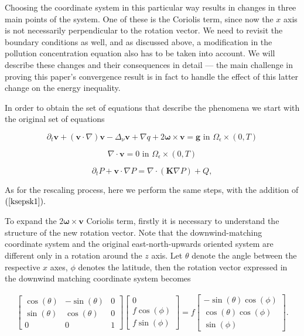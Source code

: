 \documentclass[11pt]{article}
\begin{document}
Choosing the coordinate system in this particular way results in changes in three main points of the system. One of these is the Coriolis term, since now the $x$ axis is not necessarily perpendicular to the rotation vector. We need to revisit the boundary conditions as well, and as discussed above, a modification in the pollution concentration equation also has to be taken into account. We will describe these changes and their consequences in detail --- the main challenge in proving this paper's convergence result is in fact to handle the effect of this latter change on the energy inequality.

In order to obtain the set of equations that describe the phenomena we start with the original set of equations

\begin{equation} \label{originalEQ-V}
  \partial_t \mathbf{v} + (\mathbf{v} \cdot \nabla)\mathbf{v} -\Delta_{\nu} \mathbf{v} + \nabla q + 2 \mathbf{\omega} \times \mathbf{v}= \mathbf{g} \text{ in } \Omega_{\epsilon} \times (0,T)
\end{equation}
    
\begin{equation} \label{originalEQ-I}
  \nabla \cdot \mathbf{v} = 0 \text{ in } \Omega_{\epsilon} \times (0,T)
\end{equation}
    
\begin{equation} \label{diffusive}
  \partial_t P + \mathbf{v} \cdot \nabla P = \nabla \cdot (\mathbf{K} \nabla P) + Q,
\end{equation}

As for the rescaling process, here we perform the same steps, with the addition of $(\ref{ksepsk1}).$

To expand the $2 \mathbf{\omega} \times \mathbf{v}$ Coriolis term, firstly it is necessary to understand the structure of the new rotation vector. Note that the downwind-matching coordinate system and the original east-north-upwards oriented system are different only in a rotation around the $z$ axis. Let $\theta$ denote the angle between the respective $x$ axes, $\phi$ denotes the latitude, then the rotation vector expressed in the downwind matching coordinate system becomes

\begin{gather}
 \begin{bmatrix} \cos(\theta) & -\sin(\theta) & 0 \\ \sin(\theta) & \cos(\theta) & 0 \\ 0 & 0 & 1 \end{bmatrix} \begin{bmatrix} 0 \\ f \cos(\phi) \\ f \sin(\phi) \end{bmatrix}
 =
  f \begin{bmatrix} -\sin(\theta)\cos(\phi) \\ \cos(\theta) \cos(\phi) \\ \sin(\phi) \end{bmatrix}.
\end{gather}
\end{document}
